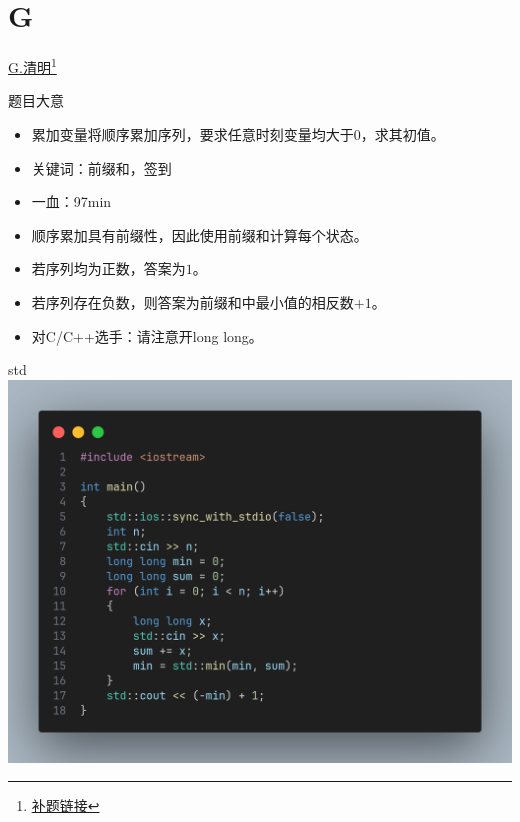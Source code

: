 \documentclass{beamer}
\begin{document}
    \section{G}
    \hypertarget{G}{}
    \begin{frame}{\hyperlink{toc}{G.清明}\footnote{\href{https://acm816.cn/p/242}{\underline{补题链接}}}}
        \begin{block}{题目大意}
            \begin{itemize}
                \item 累加变量将顺序累加序列，要求任意时刻变量均大于$0$，求其初值。
                \item 关键词：前缀和，签到
                \item 一血：97min
            \end{itemize}
        \end{block}
        \begin{itemize}
            \item 顺序累加具有前缀性，因此使用前缀和计算每个状态。
            \item 若序列均为正数，答案为$1$。
            \item 若序列存在负数，则答案为前缀和中最小值的相反数$+1$。
            \item 对C/C++选手：请注意开long long。
        \end{itemize}
    \end{frame}
    \begin{frame}{std}
        \centering\includegraphics[scale=0.25]{images/std/G.png}
    \end{frame}
\end{document}
